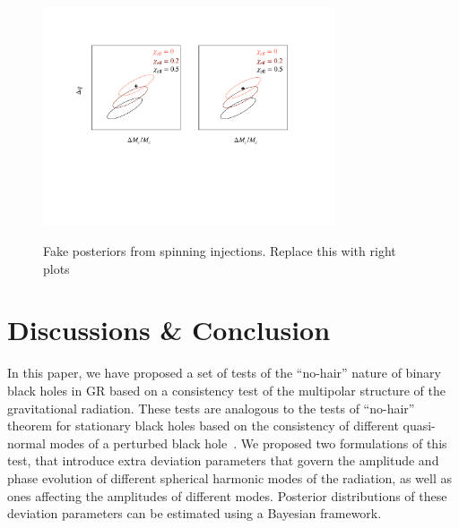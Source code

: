 \documentclass[prd,preprintnumbers,twocolumn,eqsecnum,floatfix,a4paper,nofootinbib,superscriptaddress]{revtex4}
\begin{document}
\begin{figure}[htb] 
\begin{center}
\includegraphics[width=3.4in]{figs/cartoon_plot.pdf}
\label{fig:posterior_spin}
\caption{Fake posteriors from spinning injections. Replace this with right plots}
\end{center} 
\end{figure}

\section{Discussions \& Conclusion}
\label{sec:conclusions}

In this paper, we have proposed a set of tests of the ``no-hair'' nature of binary black holes in GR based on a consistency test of the multipolar structure of the gravitational radiation. These tests are analogous to the tests of ``no-hair'' theorem for stationary black holes based on the consistency of different quasi-normal modes of a perturbed black hole~\cite{xx}. We proposed two formulations of this test, that introduce extra deviation parameters that govern the amplitude and phase evolution of different spherical harmonic modes of the radiation, as well as ones affecting the amplitudes of different modes. Posterior distributions of these deviation parameters can be estimated using a Bayesian framework. 
\end{document}
